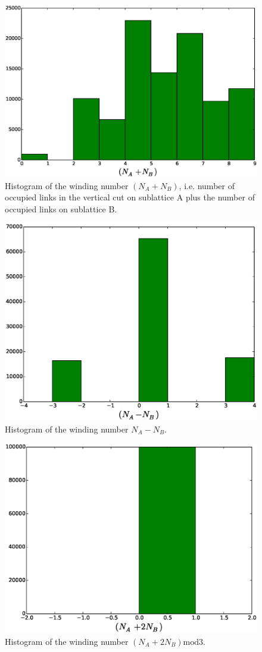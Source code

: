 \documentclass[aps,floatfix,11pt]{revtex4-1}
\begin{document}
\begin{figure}[h]
    \centering
    \includegraphics[width=8.5 cm]{W_vrt_NApNB_no_mod_str_dmr_mdl}
    \caption{Histogram of the winding number $(N_A + N_B)$, i.e. number of occupied links in the
    vertical cut on sublattice A plus the number of occupied links on sublattice B.\label{}}
\end{figure}


\begin{figure}[h]
    \centering
    \includegraphics[width=8.5 cm]{W_vrt_NAmNB_str_dmr_mdl}
    \caption{Histogram of the winding number $N_A - N_B$.\label{}}
\end{figure}

\begin{figure}[h]
    \centering
    \includegraphics[width=8.5 cm]{W_vrt_NAp2NB_str_dmr_mdl}
    \caption{Histogram of the winding number $(N_A + 2N_B)\mathrm{mod}3$.\label{}}
\end{figure}
\end{document}
